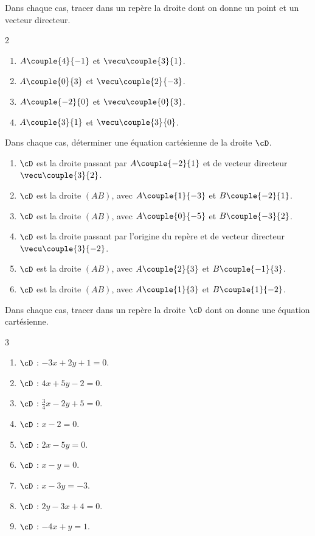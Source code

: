 
\exo

Dans chaque cas, tracer dans un repère la droite dont on donne un point et un vecteur directeur.
\vspace{-6pt}
\setlength{\columnsep}{1cm}
\setlength{\columnseprule}{0pt}
\begin{multicols}{2}
\begin{enumerate}
\item $A\couple{4}{-1}$ et $\vecu\couple{3}{1}$.
\smallskip
\item $A\couple{0}{3}$ et $\vecu\couple{2}{-3}$.

\item $A\couple{-2}{0}$ et $\vecu\couple{0}{3}$.
\smallskip
\item $A\couple{3}{1}$ et $\vecu\couple{3}{0}$.
\end{enumerate}
\end{multicols}
\vspace{-6pt}

\exo

Dans chaque cas, déterminer une équation cartésienne de la droite $\cD$.
\begin{enumerate}
\item $\cD$ est la droite passant par $A\couple{-2}{1}$ et de vecteur directeur $\vecu\couple{3}{2}$.
\smallskip
\item $\cD$ est la droite $(AB)$, avec $A\couple{1}{-3}$ et $B\couple{-2}{1}$.
\smallskip
\item $\cD$ est la droite $(AB)$, avec $A\couple{0}{-5}$ et $B\couple{-3}{2}$.
\smallskip
\item $\cD$ est la droite passant par l'origine du repère et de vecteur directeur $\vecu\couple{3}{-2}$.
\smallskip
\item $\cD$ est la droite $(AB)$, avec $A\couple{2}{3}$ et $B\couple{-1}{3}$.
\smallskip
\item $\cD$ est la droite $(AB)$, avec $A\couple{1}{3}$ et $B\couple{1}{-2}$.
\end{enumerate}

\exo

Dans chaque cas, tracer dans un repère la droite $\cD$ dont on donne une équation cartésienne.
\vspace{-6pt}
\setlength{\columnsep}{1cm}
\setlength{\columnseprule}{0pt}
\begin{multicols}{3}
\begin{enumerate}
\item $\cD$ : $-3x+2y+1=0$.
\medskip
\item $\cD$ : $4x+5y-2=0$.
\medskip
\item $\cD$ : $\frac{3}{4}x-2y+5=0$.
\medskip
\item $\cD$ : $x-2=0$.
\medskip
\item $\cD$ : $2x-5y=0$.
\medskip
\item $\cD$ : $x-y=0$.
\medskip
\item $\cD$ : $x-3y=-3$.
\medskip
\item $\cD$ : $2y-3x+4=0$.
\medskip
\item $\cD$ : $-4x+y=1$.
\end{enumerate}
\end{multicols}
\vspace{-6pt}

